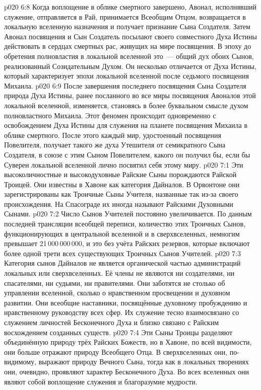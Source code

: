 \vs p020 6:8 Когда воплощение в облике смертного завершено, Авонал, исполнявший служение, отправляется в Рай, принимается Всеобщим Отцом, возвращается в локальную вселенную назначения и получает признание Сына Создателя. Затем Авонал посвящения и Сын Создатель посылают своего совместного Духа Истины действовать в сердцах смертных рас, живущих на мире посвящения. В эпоху до обретения полновластия в локальной вселенной это~--- общий дух обоих Сынов, реализованный Созидательным Духом. Он несколько отличается от Духа Истины, который характеризует эпохи локальной вселенной после седьмого посвящения Михаила.
\vs p020 6:9 После завершения последнего посвящения Сына Создателя природа Духа Истины, ранее посланного во все миры посвящения Авоналов этой локальной вселенной, изменяется, становясь в более буквальном смысле духом полновластного Михаила. Этот феномен происходит одновременно с освобождением Духа Истины для служения на планете посвящения Михаила в облике смертного. После этого каждый мир, удостоенный посвящения Повелителя, получает такого же духа Утешителя от семикратного Сына Создателя, в союзе с этим Сыном Повелителем, какого он получил бы, если бы Суверен локальной вселенной лично посвятил себя этому миру.
\vs p020 7:1 Эти высоколичностные и высокодуховные Райские Сыны порождаются Райской Троицей. Они известны в Хавоне как категория Дайналов. В Орвонтоне они зарегистрированы как Троичные Сыны Учителя, названные так из\hyp{}за своего происхождения. На Спасограде их иногда называют Райскими Духовными Сынами.
\vs p020 7:2 Число Сынов Учителей постоянно увеличивается. По данным последней трансляции всеобщей переписи, количество этих Троичных Сынов, функционирующих в центральной вселенной и в сверхвселенных, немногим превышает 21\,000\,000\,000, и это без учёта Райских резервов, которые включают более одной трети всех существующих Троичных Сынов Учителей.
\vs p020 7:3 Категория сынов Дайналов не является органической частью администраций локальных или сверхвселенных. Её члены не являются ни создателями, ни спасателями, ни судьями, ни правителями. Они заботятся не столько об управлении вселенной, сколько о нравственном просвещении и духовном развитии. Они всеобщие наставники, посвящённые духовному пробуждению и нравственному руководству всех сфер. Их служение тесно взаимосвязано со служением личностей Бесконечного Духа и близко связано с Райским восхождением созданных существ.
\vs p020 7:4 Эти Сыны Троицы разделяют объединённую природу трёх Райских Божеств, но в Хавоне, по всей видимости, они больше отражают природу Всеобщего Отца. В сверхвселенных они, по\hyp{}видимому, выражают природу Вечного Сына, тогда как в локальных творениях они, очевидно, проявляют характер Бесконечного Духа. Во всех вселенных они являют собой воплощение служения и благоразумие мудрости.
